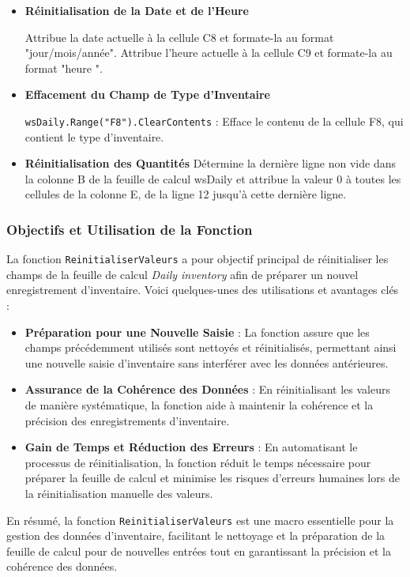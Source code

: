 \documentclass[a4paper, oneside, 12pt, final]{extreport}
\begin{document}
\begin{itemize}
\item\textbf{Réinitialisation de la Date et de l’Heure}

Attribue la date actuelle à la cellule C8 et formate-la au format "jour/mois/année". Attribue l'heure actuelle à la cellule C9 et formate-la au format "heure
".
\item\textbf{Effacement du Champ de Type d'Inventaire}

\texttt{wsDaily.Range("F8").ClearContents} : Efface le contenu de la cellule F8, qui contient le type d'inventaire.

\item\textbf{Réinitialisation des Quantités}
Détermine la dernière ligne non vide dans la colonne B de la feuille de calcul wsDaily et attribue la valeur 0 à toutes les cellules de la colonne E, de la ligne 12 jusqu'à cette dernière ligne.
\end{itemize}



\subsubsection{Objectifs et Utilisation de la Fonction}

La fonction \texttt{ReinitialiserValeurs} a pour objectif principal de réinitialiser les champs de la feuille de calcul \textit{Daily inventory} afin de préparer un nouvel enregistrement d'inventaire. Voici quelques-unes des utilisations et avantages clés :

\begin{itemize}
    \item \textbf{Préparation pour une Nouvelle Saisie} : La fonction assure que les champs précédemment utilisés sont nettoyés et réinitialisés, permettant ainsi une nouvelle saisie d'inventaire sans interférer avec les données antérieures.
    \item \textbf{Assurance de la Cohérence des Données} : En réinitialisant les valeurs de manière systématique, la fonction aide à maintenir la cohérence et la précision des enregistrements d'inventaire.
    \item \textbf{Gain de Temps et Réduction des Erreurs} : En automatisant le processus de réinitialisation, la fonction réduit le temps nécessaire pour préparer la feuille de calcul et minimise les risques d'erreurs humaines lors de la réinitialisation manuelle des valeurs.
\end{itemize}

En résumé, la fonction \texttt{ReinitialiserValeurs} est une macro essentielle pour la gestion des données d'inventaire, facilitant le nettoyage et la préparation de la feuille de calcul pour de nouvelles entrées tout en garantissant la précision et la cohérence des données.
\end{document}
